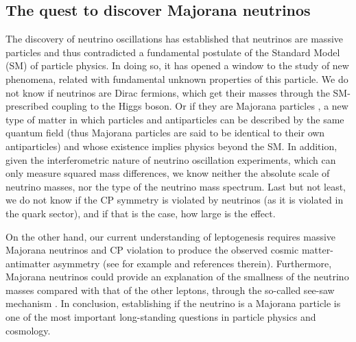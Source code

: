 \subsection{The quest to discover Majorana neutrinos}

The discovery of neutrino oscillations \cite{Super-Kamiokande:1998kpq,SNO:2001kpb,SNO:2002tuh} has established that neutrinos are massive
particles \cite{GonzalezGarcia:2002dz} and thus contradicted a fundamental postulate of the Standard Model (SM) of particle physics. In doing so, it has opened a window to the study of new phenomena, related with fundamental unknown properties of this particle. We do not know if neutrinos are Dirac fermions, which get their masses through the SM-prescribed coupling to the Higgs boson. Or if they are Majorana particles \cite{Majorana:1937}, a new type of matter in which particles and antiparticles can be described by the same quantum field (thus Majorana particles are said to be identical to their own antiparticles) and whose existence implies physics beyond the SM. In addition, given the interferometric nature of neutrino oscillation experiments, which can only measure squared mass differences, we know neither the absolute scale of neutrino masses, nor the type of the neutrino mass spectrum. Last but not least, we do not know if the CP symmetry is violated by neutrinos (as it is violated in the quark sector), and if that is the case, how large is the effect.


On the other hand, our current understanding of leptogenesis  \cite{Fukugita:1986hr, Fukugita:1998vn} requires
massive Majorana neutrinos and CP violation to produce the observed cosmic matter-antimatter asymmetry (see for example \cite{Sarkar:1998im} and references therein). Furthermore, Majorana neutrinos could provide an explanation of the smallness of the neutrino masses compared with that of the other leptons, through the so-called see-saw mechanism
\cite{GellMann:1980vs, Yanagida:1979as, Mohapatra:1979ia}. In conclusion, establishing if the neutrino is a Majorana particle is one of the most important long-standing questions in particle physics and cosmology.

